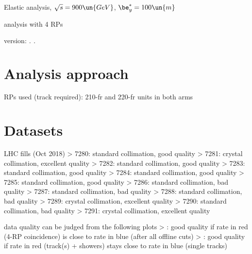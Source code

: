

\def\baseDir{/afs/cern.ch/work/j/jkaspar/work/analyses/elastic/450GeV/beta100/4rp/}


\hbox{}
\vskip-10mm

\centerline{\SetFontSizesXX Elastic analysis, $\sqrt s = 900\un{GeV}$, $\be^*_y = 100\un{m}$}
\vskip2mm
\centerline{\SetFontSizesXX analysis with 4 RPs }
\vskip2mm
\centerline{version: {\it \number\day. \number\month. \number\year}}

\vfil
\InsertToc

\vfil
\eject

\BeginText

\chapter{Analysis approach}

\> RPs used (track required): 210-fr and 220-fr units in both arms



\chapter[datasets]{Datasets}

\> 

\> LHC fills (Oct 2018)
\>> 7280: standard collimation, good quality
\>> 7281: crystal collimation, excellent quality
\>> 7282: standard collimation, good quality
\>> 7283: standard collimation, good quality
\>> 7284: standard collimation, good quality
\>> 7285: standard collimation, good quality
\>> 7286: standard collimation, bad quality
\>> 7287: standard collimation, bad quality
\>> 7288: standard collimation, bad quality
\>> 7289: crystal collimation, excellent quality
\>> 7290: standard collimation, bad quality
\>> 7291: crystal collimation, excellent quality

\> data quality can be judged from the following plots
\>> : good quality if rate in red (4-RP coincidence) is close to rate in blue (after all offline cuts)
\>> : good quality if rate in red (track(s) + showers) stays close to rate in blue (single tracks)

